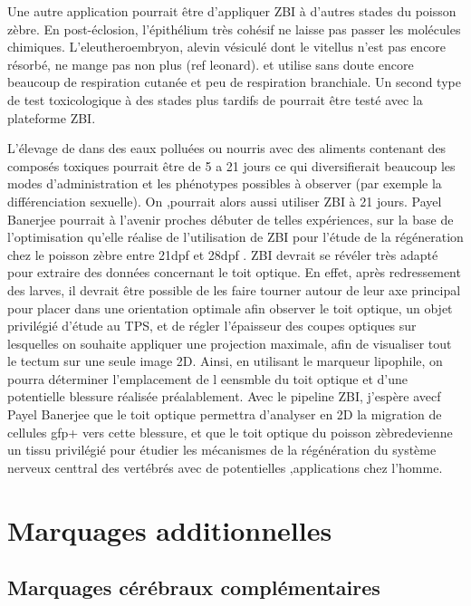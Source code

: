 \documentclass[\main/main.tex]{subfiles}
\begin{document}
Une autre application pourrait être d'appliquer ZBI à  d'autres stades du poisson zèbre.  En post-éclosion, l'épithélium très cohésif ne laisse pas passer les molécules chimiques. L'eleutheroembryon, alevin vésiculé dont le vitellus n'est pas encore résorbé, ne mange pas non plus (ref leonard). et utilise sans doute encore beaucoup de respiration cutanée et peu de respiration branchiale. Un second type de test toxicologique à des stades plus tardifs de \pz{} pourrait être testé avec la plateforme ZBI.

L'élevage de \pz{} dans des eaux polluées ou nourris avec des  aliments contenant des composés toxiques pourrait être de 5 a 21 jours ce qui diversifierait beaucoup les modes d'administration et les phénotypes possibles à observer (par exemple la différenciation sexuelle). On ,pourrait alors aussi utiliser ZBI à 21 jours. Payel Banerjee pourrait à l'avenir proches débuter de telles expériences, sur la base de l'optimisation qu'elle réalise de l'utilisation de ZBI pour l'étude de la régéneration chez le poisson zèbre entre 21dpf et 28dpf . ZBI devrait se révéler très adapté pour extraire des données concernant le toit optique. En effet, après redressement des larves, il devrait être possible de les faire tourner autour de leur axe principal pour placer dans une orientation optimale afin observer le toit optique, un objet privilégié d'étude au TPS, et de régler l'épaisseur des coupes optiques sur lesquelles on souhaite appliquer une projection maximale, afin de visualiser tout le tectum sur une seule image 2D. Ainsi, en utilisant le marqueur lipophile, on pourra déterminer l'emplacement de l eensmble du toit optique et d'une potentielle blessure réalisée préalablement. Avec le pipeline ZBI, j'espère avecf Payel Banerjee que le toit optique permettra d'analyser en 2D la migration de cellules gfp+ vers cette blessure, et que le toit optique du poisson zèbredevienne un tissu privilégié pour étudier les mécanismes de la régénération du système nerveux centtral des vertébrés avec de potentielles ,applications chez l'homme.

\section{Marquages additionnelles}
\label{sec:label}

    \subsection{Marquages cérébraux complémentaires}
   
\end{document}

